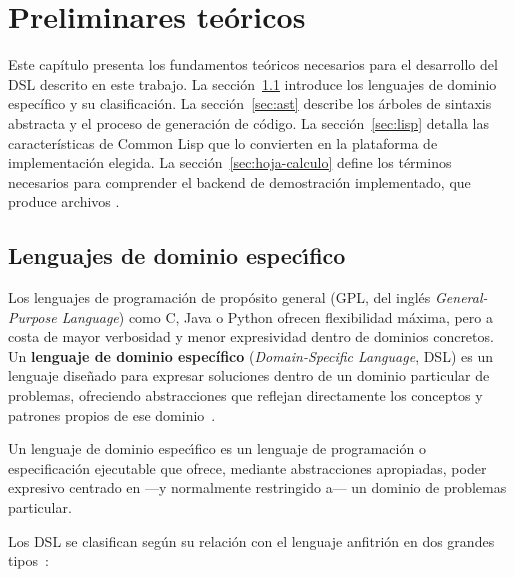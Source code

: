 \chapter{Preliminares te\'oricos}
\label{cap:teoria}

Este capítulo presenta los fundamentos teóricos necesarios para el desarrollo
del DSL descrito en este trabajo.  La sección~\ref{sec:dsl} introduce los
lenguajes de dominio específico y su clasificación.
La sección~\ref{sec:ast} describe los árboles de sintaxis abstracta y el
proceso de generación de código.
La sección~\ref{sec:lisp} detalla las características de Common Lisp que lo
convierten en la plataforma de implementación elegida.
La sección~\ref{sec:hoja-calculo} define los términos necesarios para
comprender el backend de demostración implementado, que produce
archivos \xlsx{}.

\section{Lenguajes de dominio espec\'{\i}fico}
\label{sec:dsl}

Los lenguajes de programación de propósito general (GPL, del inglés
\textit{General-Purpose Language}) como C, Java o Python ofrecen flexibilidad
máxima, pero a costa de mayor verbosidad y menor expresividad dentro de
dominios concretos.  Un \textbf{lenguaje de dominio específico}
(\textit{Domain-Specific Language}, DSL) es un lenguaje diseñado para
expresar soluciones dentro de un dominio particular de problemas, ofreciendo
abstracciones que reflejan directamente los conceptos y patrones propios de
ese dominio~\cite{fowler2010}.

\begin{definition}
Un lenguaje de dominio espec\'{\i}fico es un lenguaje de programaci\'on o
especificaci\'on ejecutable que ofrece, mediante abstracciones apropiadas,
poder expresivo centrado en ---y normalmente restringido a--- un dominio de
problemas particular.
\end{definition}

Los DSL se clasifican según su relación con el lenguaje anfitrión en dos
grandes tipos~\cite{fowler2010,mernik2005}:

